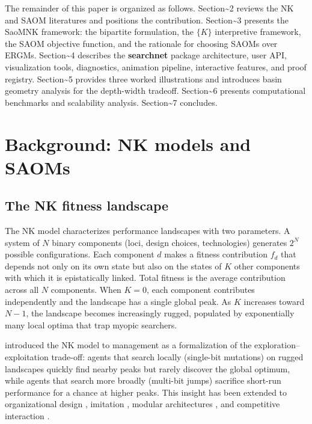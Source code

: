 \documentclass[
]{article}
\begin{document}
The remainder of this paper is organized as follows.
Section\textasciitilde2 reviews the NK and SAOM literatures and
positions the contribution. Section\textasciitilde3 presents the SaoMNK
framework: the bipartite formulation, the \(\{K\}\) interpretive
framework, the SAOM objective function, and the rationale for choosing
SAOMs over ERGMs. Section\textasciitilde4 describes the
\textbf{searchnet} package architecture, user API, visualization tools,
diagnostics, animation pipeline, interactive features, and proof
registry. Section\textasciitilde5 provides three worked illustrations
and introduces basin geometry analysis for the depth-width tradeoff.
Section\textasciitilde6 presents computational benchmarks and
scalability analysis. Section\textasciitilde7 concludes.

\section{Background: NK models and SAOMs}\label{sec:background}

\subsection{The NK fitness landscape}\label{the-nk-fitness-landscape}

The NK model \citep{Kauffman1987, KauffmanWeinberger1989} characterizes
performance landscapes with two parameters. A system of \(N\) binary
components (loci, design choices, technologies) generates \(2^N\)
possible configurations. Each component \(d\) makes a fitness
contribution \(f_d\) that depends not only on its own state but also on
the states of \(K\) other components with which it is epistatically
linked. Total fitness is the average contribution across all \(N\)
components. When \(K = 0\), each component contributes independently and
the landscape has a single global peak. As \(K\) increases toward
\(N - 1\), the landscape becomes increasingly rugged, populated by
exponentially many local optima that trap myopic searchers.

\citet{Levinthal1997} introduced the NK model to management as a
formalization of the exploration--exploitation trade-off: agents that
search locally (single-bit mutations) on rugged landscapes quickly find
nearby peaks but rarely discover the global optimum, while agents that
search more broadly (multi-bit jumps) sacrifice short-run performance
for a chance at higher peaks. This insight has been extended to
organizational design \citep{SiggelkowRivkin2005}, imitation
\citep{Rivkin2000}, modular architectures \citep{EthirajLevinthal2004},
and competitive interaction \citep{Lenox2006}.
\end{document}
